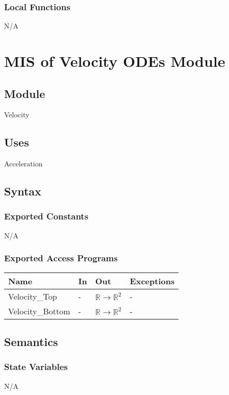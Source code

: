 \documentclass[12pt, titlepage]{article}
\begin{document}
\subsubsection{Local Functions}

N/A
\newpage


\section{MIS of Velocity ODEs Module} \label{VOModule} 
 
\subsection{Module}
Velocity

\subsection{Uses}
Acceleration

\subsection{Syntax}

\subsubsection{Exported Constants}
N/A

\subsubsection{Exported Access Programs}

\begin{center}
\begin{tabular}{p{4cm} p{2cm} p{2cm} p{4cm}}
\hline
\textbf{Name} & \textbf{In} & \textbf{Out} & \textbf{Exceptions} \\
\hline
Velocity\_Top & - & $\mathbb{R} \rightarrow \mathbb{R}^2$ & - \\
\hline
Velocity\_Bottom & - & $\mathbb{R} \rightarrow \mathbb{R}^2$ & - \\
\hline
\end{tabular}
\end{center}

\subsection{Semantics}

\subsubsection{State Variables}
N/A
\end{document}
